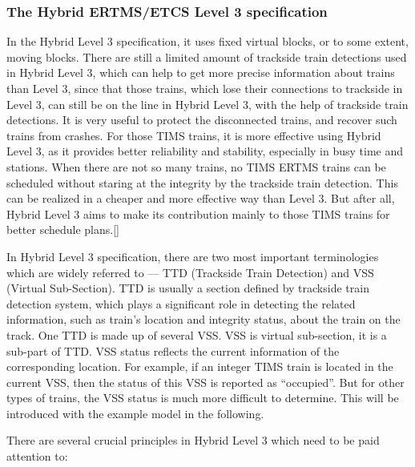 \documentclass[article,dr=phil,type=drfinal,colorback,accentcolor=tud9c]{tudthesis}
\begin{document}
  \subsubsection{The Hybrid ERTMS/ETCS Level 3 specification} 
  
  In the Hybrid Level 3 specification, it uses fixed virtual blocks, or to some extent, moving blocks. There are still a limited amount of trackside train detections used in Hybrid Level 3, which can help to get more precise information about trains than Level 3, since that those trains, which lose their connections to trackside in Level 3, can still be on the line in Hybrid Level 3, with the help of trackside train detections. It is very useful to protect the disconnected trains, and recover such trains from crashes. For those TIMS trains, it is more effective using Hybrid Level 3, as it provides better reliability and stability, especially in busy time and stations. When there are not so many trains, no TIMS ERTMS trains can be scheduled without staring at the integrity by the trackside train detection. This can be realized in a cheaper and more effective way than Level 3. But after all, Hybrid Level 3 aims to make its contribution mainly to those TIMS trains for better schedule plans.[]
  
  In Hybrid Level 3 specification, there are two most important terminologies which are widely referred to --- TTD (Trackside Train Detection) and VSS (Virtual Sub-Section). TTD is usually a section defined by trackside train detection system, which plays a significant role in detecting the related information, such as train’s location and integrity status, about the train on the track. One TTD is made up of several VSS. VSS is virtual sub-section, it is a sub-part of TTD. VSS status reflects the current information of the corresponding location. For example, if an integer TIMS train is located in the current VSS, then the status of this VSS is reported as “occupied”. But for other types of trains, the VSS status is much more difficult to determine. This will be introduced with the example model in the following.

  There are several crucial principles in Hybrid Level 3 which need to be paid attention to:
\end{document}
